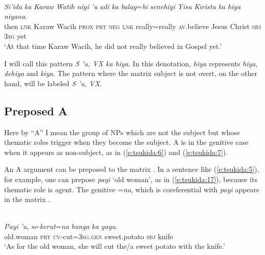 \documentclass[output=paper
,modfonts
,nonflat]{langsci/langscibook}
\begin{document}
\begin{exe}
	\label{e:tsukida:16}\\
	\gll \textit{Si'ida} \textit{ka} \textit{Karaw} \textit{Watih} \textit{niyi} \textit{'u} \textit{adi} \textit{ka} \textit{balay}=\textit{bi} \textit{senehiyi} \textit{Yisu} \textit{Kiristu} \textit{ka} \textit{hiya} \textit{niyana}.\\
	then \textsc{lnk} Karaw Wacih \textsc{prox} \textsc{prt} \textsc{neg} \textsc{lnk} really=really \textsc{av}.believe Jesus Christ \textsc{sbj} \textsc{3sg} yet\\
	\glt ‘At that time Karaw Wacih, he did not really believed in Gospel yet.’
\end{exe}

\noindent
I will call this pattern \textit{S 'u, VX ka hiya}. In this denotation, \textit{hiya} represents \textit{hiya}, \textit{dehiya} and \textit{kiya}. The pattern where the matrix subject is not overt, on the other hand, will be labeled \textit{S 'u, VX}.

\subsection{\label{s:tsukida:2.2}Preposed A}

Here by “A” I mean the group of NPs which are not the subject but whose thematic roles trigger  when they become the subject. A  is in the genitive case when it appears as non-subject, as in (\ref{e:tsukida:6}) and (\ref{e:tsukida:7}). 

An A argument can be preposed to the matrix . In a sentence like (\ref{e:tsukida:5}), for example, one can prepose \textit{payi} ‘old woman’, as in (\ref{e:tsukida:17}), because its thematic role is agent. The genitive  =\textit{na}, which is coreferential with \textit{payi}  appears in the matrix .

\begin{exe}
	\label{e:tsukida:17}\\
	\gll \textit{Payi} \textit{'u}, \textit{se}-\textit{kerut}=\textit{na} \textit{bunga} \textit{ka} \textit{yayu}.\\
	old.woman \textsc{prt}  \textsc{cv}-cut=\textsc{3sg.gen} sweet.potato \textsc{sbj} knife\\
	\glt ‘As for the old woman, she will cut the/a sweet potato with the knife.’
\end{exe}
\end{document}
